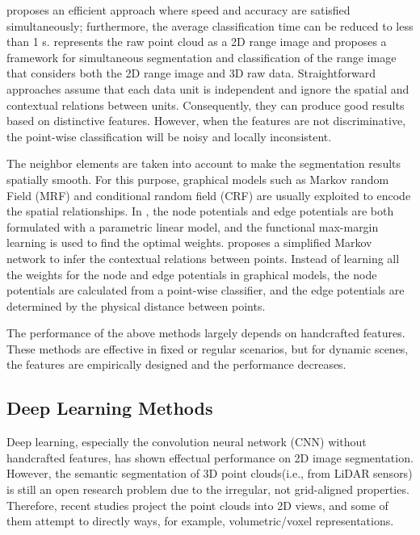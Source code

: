 	\cite{hu2013efficient} proposes an efficient approach where speed and accuracy are satisfied simultaneously; furthermore, the average classification time can be reduced to less than 1 s. \cite{zhao2010scene} represents the raw point cloud as a 2D range image and proposes a framework for simultaneous segmentation and classification of the range image that considers both the 2D range image and 3D raw data. Straightforward approaches assume that each data unit is independent and ignore the spatial and contextual relations between units. Consequently, they can produce good results based on distinctive features. However, when the features are not discriminative, the point-wise classification will be noisy and locally inconsistent\cite{munoz2009onboard}.
	
	The neighbor elements are taken into account to make the segmentation results spatially smooth. For this purpose, graphical models such as Markov random Field (MRF) and conditional random field (CRF) are usually exploited to encode the spatial relationships. In \cite{munoz2009contextual}, the node potentials and edge potentials are both formulated with a parametric linear model, and the functional max-margin learning is used to find the optimal weights. \cite{lu2012simplified} proposes a simplified Markov network to infer the contextual relations between points. Instead of learning all the weights for the node and edge potentials in graphical models, the node potentials are calculated from a point-wise classifier, and the edge potentials are determined by the physical distance between points. 
	
	The performance of the above methods largely depends on handcrafted features. These methods are effective in fixed or regular scenarios, but for dynamic scenes, the features are empirically designed and the performance decreases.
	
	\subsection{Deep Learning Methods}
	Deep learning, especially the convolution neural network (CNN) without handcrafted features, has shown effectual performance on 2D image segmentation\cite{garcia2017review}. However, the semantic segmentation of 3D point clouds(i.e., from LiDAR sensors) is still an open research problem\cite{engelmann2017exploring} due to the irregular, not grid-aligned properties. Therefore, recent studies project the point clouds into 2D views, and some of them attempt to directly ways, for example, volumetric/voxel representations.
	
